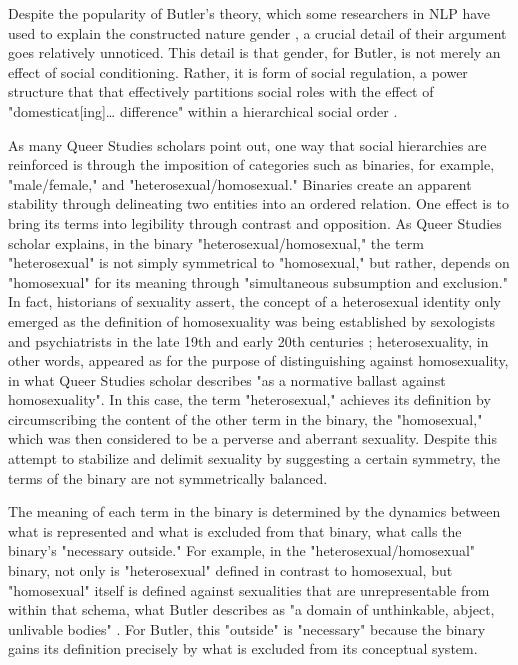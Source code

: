 \documentclass[11pt]{article}
\begin{document}
Despite the popularity of Butler's theory, which some researchers in
NLP have used to explain the constructed nature gender
\citep{devinney:2022}, a crucial detail of their argument goes
relatively unnoticed. This detail is that gender, for Butler, is not
merely an effect of social conditioning. Rather, it is form of social
regulation, a power structure that that effectively partitions social
roles with the effect of "domesticat[ing]… difference" within a
hierarchical social order \citep{butler:1993}.

As many Queer Studies scholars point out, one way that social
hierarchies are reinforced is through the imposition of categories
such as binaries, for example, "male/female," and
"heterosexual/homosexual." Binaries create an apparent stability
through delineating two entities into an ordered relation. One effect
is to bring its terms into legibility through contrast and opposition.
As Queer Studies scholar \citet{sedgwick:1990} explains, in the binary
"heterosexual/homosexual," the term "heterosexual" is not simply
symmetrical to "homosexual," but rather, depends on "homosexual" for
its meaning through "simultaneous subsumption and exclusion." In fact,
historians of sexuality assert, the concept of a heterosexual identity
only emerged as the definition of homosexuality was being established
by sexologists and psychiatrists in the late 19th and early 20th
centuries \citep{amin:2022}; heterosexuality, in other words, appeared as for the
purpose of distinguishing against homosexuality, in what Queer Studies scholar \citet{amin:2022}
describes "as a normative ballast against
homosexuality". In this case, the term
"heterosexual," achieves its definition by circumscribing the content
of the other term in the binary, the "homosexual," which was then considered to be a perverse and aberrant sexuality. Despite this attempt to stabilize and
delimit sexuality by suggesting a certain symmetry, the terms of the
binary are not symmetrically balanced.

The meaning of each term in the binary is determined by the dynamics
between what is represented and what is excluded from that binary,
what \citet{butler:1993} calls the binary's "necessary outside."
For example, in the "heterosexual/homosexual" binary, not only is
"heterosexual" defined in contrast to homosexual, but "homosexual"
itself is defined against sexualities that are unrepresentable from
within that schema, what Butler describes as "a domain of unthinkable,
abject, unlivable bodies" \citep{butler:1993}. For Butler, this "outside" is "necessary" because
the binary gains its definition precisely by what is excluded from its
conceptual system.
\end{document}
